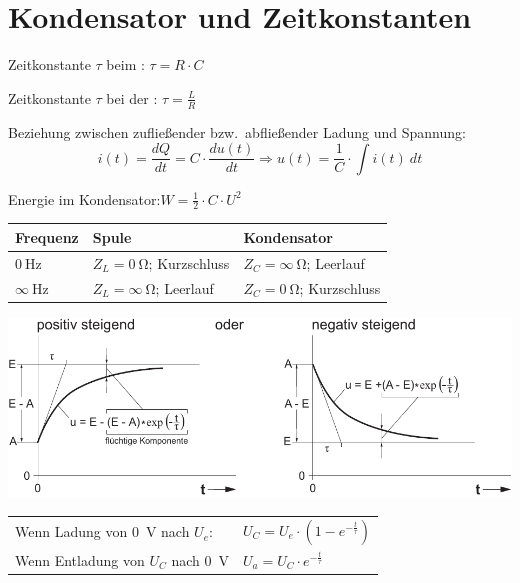 \documentclass[a5paper, 12pt, twoside]{scrartcl}
\begin{document}
\vspace{1cm}

\section{Kondensator und Zeitkonstanten}

Zeitkonstante \(\tau\) beim : \dotfill \(\tau = R \cdot C\)

Zeitkonstante \(\tau\) bei der : \dotfill \(\tau = \frac{L}{R}\)

Beziehung zwischen zufließender bzw.\ abfließender Ladung und Spannung:
\[i(t) = \frac{dQ}{dt} = C \cdot \frac{du(t)}{dt} \Rightarrow u(t) = \frac{1}{C} \cdot \int i(t)\ dt\]

Energie im Kondensator:\dotfill\(W = \frac{1}{2} \cdot C \cdot U^2\)

\vfill

{\centering
  \begin{tabular}{lll}
    \toprule
    Frequenz & Spule & Kondensator\\
    \midrule
    \(\SI{0}{\hertz}\) & \(Z_L = \SI{0}{\ohm}\); Kurzschluss & \(Z_C = \infty\ \si{\ohm}\); Leerlauf\\
    \(\infty\ \si{\hertz}\) & \(Z_L = \infty\ \si{\ohm}\); Leerlauf & \(Z_C = \SI{0}{\ohm}\); Kurzschluss\\
    \bottomrule
  \end{tabular}
  \par
}

\clearpage

{\centering
  \includegraphics[width=.7\textwidth]{LadekurveKondensator}
}

\begin{center}
  \begin{tabular}{ll}
    \toprule
    Wenn Ladung von \SI{0}{\volt} nach \(U_e\): & \(U_C = U_e \cdot (1 - e^{-\frac{t}{\tau}})\)\\
    Wenn Entladung von \(U_C\) nach \SI{0}{\volt} & \(U_a = U_C \cdot e^{-\frac{t}{\tau}}\)\\
    \bottomrule
  \end{tabular}
\end{center}
\end{document}
